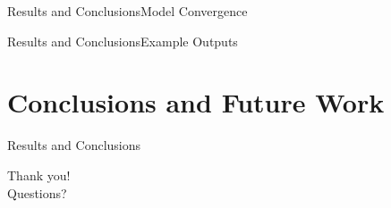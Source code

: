 \documentclass[handout]{beamer}
\begin{document}
\begin{frame}{Results and Conclusions}{Model Convergence}

\end{frame}

\begin{frame}{Results and Conclusions}{Example Outputs}

\end{frame}

\section{Conclusions and Future Work}
\begin{frame}{Results and Conclusions}{}

\end{frame}

\begin{frame}
\center
\color{blue}
\huge{Thank you!}\\
\huge{Questions?}\\
\end{frame}
\end{document}
